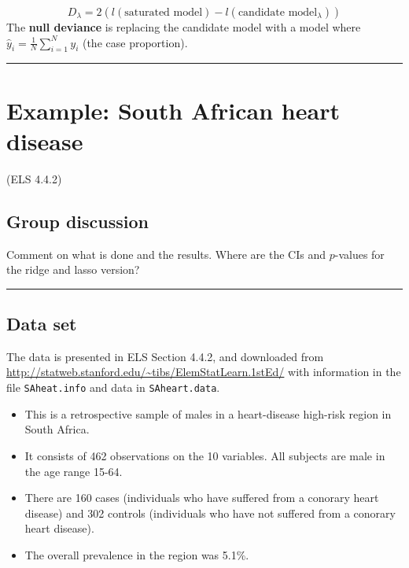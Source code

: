 \documentclass[
  letterpaper,
  DIV=11,
  numbers=noendperiod]{scrartcl}
\providecommand{\tightlist}{%
  \setlength{\itemsep}{0pt}\setlength{\parskip}{0pt}}\usepackage{longtable,booktabs,array}
\begin{document}
\[D_{\lambda}=2(l(\text{saturated model})-l(\text{candidate model}_{\lambda}))\]
The \textbf{null deviance} is replacing the candidate model with a model
where \(\hat{y}_i=\frac{1}{N}\sum_{i=1}^N y_i\) (the case proportion).

\begin{center}\rule{0.5\linewidth}{0.5pt}\end{center}

\hypertarget{example-south-african-heart-disease}{%
\section{Example: South African heart
disease}\label{example-south-african-heart-disease}}

(ELS 4.4.2)

\hypertarget{group-discussion}{%
\subsection{Group discussion}\label{group-discussion}}

Comment on what is done and the results. Where are the CIs and
\(p\)-values for the ridge and lasso version?

\begin{center}\rule{0.5\linewidth}{0.5pt}\end{center}

\hypertarget{data-set}{%
\subsection{Data set}\label{data-set}}

The data is presented in ELS Section 4.4.2, and downloaded from
\url{http://statweb.stanford.edu/~tibs/ElemStatLearn.1stEd/} with
information in the file \texttt{SAheat.info} and data in
\texttt{SAheart.data}.

\begin{itemize}
\tightlist
\item
  This is a retrospective sample of males in a heart-disease high-risk
  region in South Africa.
\item
  It consists of 462 observations on the 10 variables. All subjects are
  male in the age range 15-64.
\item
  There are 160 cases (individuals who have suffered from a conorary
  heart disease) and 302 controls (individuals who have not suffered
  from a conorary heart disease).\\
\item
  The overall prevalence in the region was 5.1\%.
\end{itemize}
\end{document}
